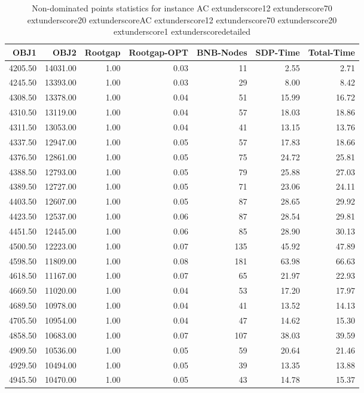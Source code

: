 \begin{table}
\caption{Non-dominated points statistics for instance AC	extunderscore12	extunderscore70	extunderscore20	extunderscoreAC	extunderscore12	extunderscore70	extunderscore20	extunderscore1	extunderscoredetailed}
\label{tab:stats/AC_12_70_20_AC_12_70_20_1_detailed}
\begin{tabular}{rrrrrrr}
\toprule
OBJ1 & OBJ2 & Rootgap & Rootgap-OPT & BNB-Nodes & SDP-Time & Total-Time \\
\midrule
4205.50 & 14031.00 & 1.00 & 0.03 & 11 & 2.55 & 2.71 \\
4245.50 & 13393.00 & 1.00 & 0.03 & 29 & 8.00 & 8.42 \\
4308.50 & 13378.00 & 1.00 & 0.04 & 51 & 15.99 & 16.72 \\
4310.50 & 13119.00 & 1.00 & 0.04 & 57 & 18.03 & 18.86 \\
4311.50 & 13053.00 & 1.00 & 0.04 & 41 & 13.15 & 13.76 \\
4337.50 & 12947.00 & 1.00 & 0.05 & 57 & 17.83 & 18.66 \\
4376.50 & 12861.00 & 1.00 & 0.05 & 75 & 24.72 & 25.81 \\
4388.50 & 12793.00 & 1.00 & 0.05 & 79 & 25.88 & 27.03 \\
4389.50 & 12727.00 & 1.00 & 0.05 & 71 & 23.06 & 24.11 \\
4403.50 & 12607.00 & 1.00 & 0.05 & 87 & 28.65 & 29.92 \\
4423.50 & 12537.00 & 1.00 & 0.06 & 87 & 28.54 & 29.81 \\
4451.50 & 12445.00 & 1.00 & 0.06 & 85 & 28.90 & 30.13 \\
4500.50 & 12223.00 & 1.00 & 0.07 & 135 & 45.92 & 47.89 \\
4598.50 & 11809.00 & 1.00 & 0.08 & 181 & 63.98 & 66.63 \\
4618.50 & 11167.00 & 1.00 & 0.07 & 65 & 21.97 & 22.93 \\
4669.50 & 11020.00 & 1.00 & 0.04 & 53 & 17.20 & 17.97 \\
4689.50 & 10978.00 & 1.00 & 0.04 & 41 & 13.52 & 14.13 \\
4705.50 & 10954.00 & 1.00 & 0.04 & 47 & 14.62 & 15.30 \\
4858.50 & 10683.00 & 1.00 & 0.07 & 107 & 38.03 & 39.59 \\
4909.50 & 10536.00 & 1.00 & 0.05 & 59 & 20.64 & 21.46 \\
4929.50 & 10494.00 & 1.00 & 0.05 & 39 & 13.35 & 13.88 \\
4945.50 & 10470.00 & 1.00 & 0.05 & 43 & 14.78 & 15.37 \\

\end{tabular}
\end{table}

